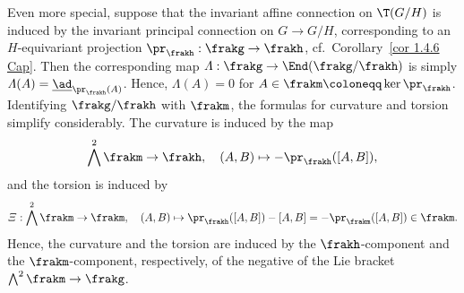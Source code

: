 Even more special, suppose that the invariant affine connection on $\T(G\slash H)$ is induced by the invariant principal connection on $G\to G\slash H$, corresponding to an $H$-equivariant projection $\pr_\frakh:\frakg\to\frakh$, cf.\ Corollary~\ref{cor 1.4.6 Cap}. Then the corresponding map $\varLambda:\frakg\to \End(\frakg\slash\frakh)$ is simply $\varLambda(A)=\underline{\ad}_{\pr_\frakh(A)}$. Hence, $\varLambda(A)=0$ for $A\in \frakm\coloneqq \ker\pr_\frakh$. Identifying $\frakg\slash\frakh$ with $\frakm$, the formulas for curvature and torsion simplify considerably. The curvature is induced by the map 
\[\bigwedge^2\frakm\to \frakh,\quad (A,B)\mapsto -\pr_\frakh([A,B]),\]
and the torsion is induced by  
\[\varXi:\bigwedge^2\frakm\to \frakm,\quad (A,B)\mapsto \pr_\frakh([A,B])-[A,B]=-\pr_\frakm([A,B])\in\frakm.\]
Hence, the curvature and the torsion are induced by the $\frakh$-component and the $\frakm$-component, respectively, of the negative of the Lie bracket $\bigwedge^2\frakm\to \frakg$.

